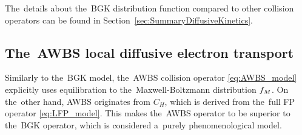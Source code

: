 The~details about the~BGK distribution function compared to other
collision operators can be found in Section~\ref{sec:SummaryDiffusiveKinetics}.

\subsection{The~AWBS local diffusive electron transport}
\label{sec:AWBSDiffusiveRegime}
Similarly to the~BGK model, the~AWBS collision operator \ref{eq:AWBS_model} 
explicitly uses equilibration to the~Maxwell-Boltzmann distribution $f_M$. 
On the~other hand, AWBS originates from $C_H$, which is derived from 
the~full FP operator \eqref{eq:LFP_model}. This makes the~AWBS operator 
to be superior to the~BGK operator, which is considered a~purely
phenomenological model.

